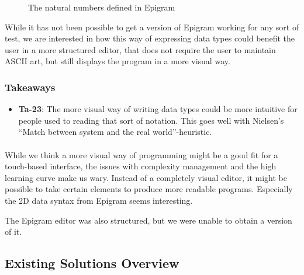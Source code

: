 \begin{figure}[htbp]
	\centering
	
	
	\caption{The natural numbers defined in Epigram}
\label{fig:epigram_data}
\end{figure}

While it has not been possible to get a version of Epigram working for any sort of test, we are interested in how this way of expressing data types could benefit the user in a more structured editor, that does not require the user to maintain ASCII art, but still displays the program in a more visual way.

\subsubsection{Takeaways}
\begin{itemize}
	\item \textbf{Ta-23}: The more visual way of writing data types could be more intuitive for people used to reading that sort of notation. This goes well with Nielsen’s ``Match between system and the real world''-heuristic.
\end{itemize}

\paragraph{}

While we think a more visual way of programming might be a good fit for a touch-based interface, the issues with complexity management and the high learning curve make us wary.
Instead of a completely visual editor, it might be possible to take certain elements to produce more readable programs. 
Especially the 2D data syntax from Epigram seems interesting.

The Epigram editor was also structured, but we were unable to obtain a
version of it.


\subsection{Existing Solutions Overview}

